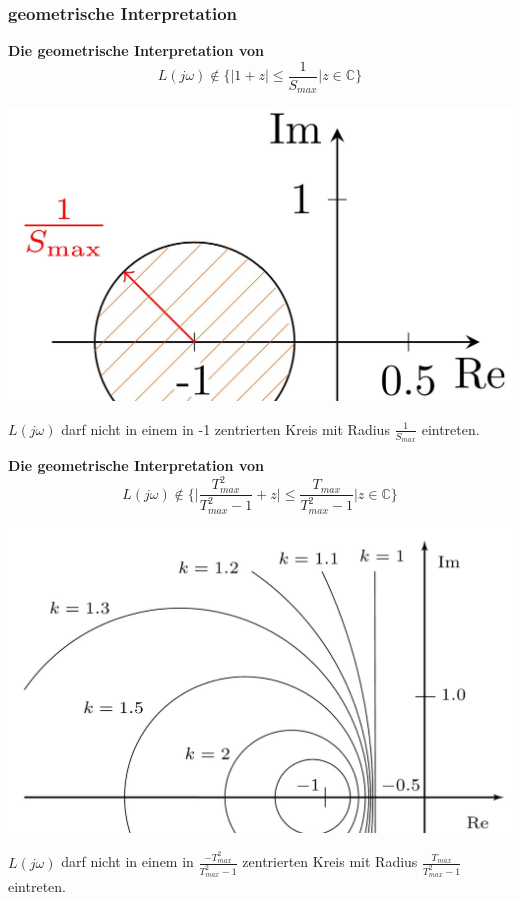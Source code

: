         \subsubsection{geometrische Interpretation}
           \textbf{Die geometrische Interpretation von} 
            \[L(j\omega) \notin \Bigg\{|1+z|\leq \frac{1}{S_{max}}\Bigg| z\in\mathbb{C}\Bigg\}\]
            \begin{center}
                \includegraphics[width = 0.6\linewidth]{images/08/Spezifikation_im_FB.jpg}
            \end{center}
         $L(j\omega)$ darf nicht in einem in -1 zentrierten Kreis mit Radius $\frac{1}{S_{max}}$ eintreten.
         
            \textbf{Die geometrische Interpretation von}
            \[L(j\omega)\notin\Bigg\{\Bigg|\frac{T_{max}^2}{T_{max}^2-1}+z\Bigg| \leq \frac{T_{max}}{T^2_{max}-1}\Bigg|z\in\mathbb{C}\Bigg\}\]
            \begin{center}
                \includegraphics[width = 0.8\linewidth]{images/08/Spezifikation_im_FB2.jpg}
            \end{center}
            $L(j\omega)$ darf nicht in einem in $\frac{-T^2_{max}}{T^2_{max}-1}$ zentrierten Kreis mit Radius $\frac{T_{max}}{T^2_{max}-1}$ eintreten.
